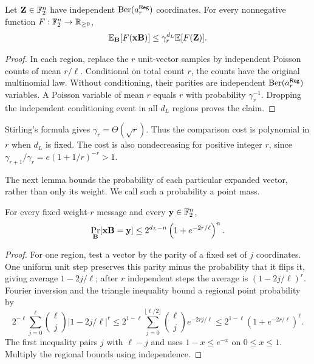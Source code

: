 \begin{lemma}
\label{lem:regular-poisson}
Let $\mathbf Z\in\mathbb F_2^n$ have independent $\operatorname{Ber}(a^{\mathsf{Reg}}_r)$ coordinates.
For every nonnegative function $F:\mathbb F_2^n\to\mathbb R_{\geq0}$,
\begin{equation}
 \mathbb E_{\mathbf B}[F(\mathbf x\mathbf B)]
 \leq\gamma_r^{d_L}\mathbb E[F(\mathbf Z)].
 \label{eq:regular-poisson}
\end{equation}
\end{lemma}

\begin{proof}
In each region, replace the $r$ unit-vector samples by independent Poisson
counts of mean $r/\ell$.  Conditional on total count $r$, the counts have the
original multinomial law.  Without conditioning, their parities are
independent $\operatorname{Ber}(a^{\mathsf{Reg}}_r)$ variables.  A Poisson variable of mean $r$
equals $r$ with probability $\gamma_r^{-1}$.  Dropping the independent
conditioning event in all $d_L$ regions proves the claim.
\end{proof}

Stirling's formula gives $\gamma_r=\Theta(\sqrt r)$.  Thus the comparison
cost is polynomial in $r$ when $d_L$ is fixed.
The cost is also nondecreasing for positive integer $r$, since
$\gamma_{r+1}/\gamma_r=e(1+1/r)^{-r}>1$.

The next lemma bounds the probability of each particular expanded vector,
rather than only its weight.  We call such a probability a point mass.

\begin{lemma}
\label{lem:regular-point-mass}
For every fixed weight-$r$ message and every $\mathbf y\in\mathbb F_2^n$,
\begin{equation}
 \Pr_{\mathbf B}[\mathbf x\mathbf B=\mathbf y]
 \leq 2^{d_L-n}\left(1+e^{-2r/\ell}\right)^n.
 \label{eq:regular-point-mass}
\end{equation}
\end{lemma}

\begin{proof}
For one region, test a vector by the parity of a fixed set of $j$
coordinates.  One uniform unit step preserves this parity minus the
probability that it flips it, giving average $1-2j/\ell$; after $r$
independent steps the average is $(1-2j/\ell)^r$.  Fourier inversion and
the triangle inequality bound a regional point probability by
\[
 2^{-\ell}\sum_{j=0}^{\ell}\binom\ell j|1-2j/\ell|^r
 \leq 2^{1-\ell}\sum_{j=0}^{\lfloor\ell/2\rfloor}
       \binom\ell j e^{-2rj/\ell}
 \leq 2^{1-\ell}(1+e^{-2r/\ell})^\ell.
\]
The first inequality pairs $j$ with $\ell-j$ and uses $1-x\leq e^{-x}$
on $0\leq x\leq1$.  Multiply the regional bounds using independence.
\end{proof}

